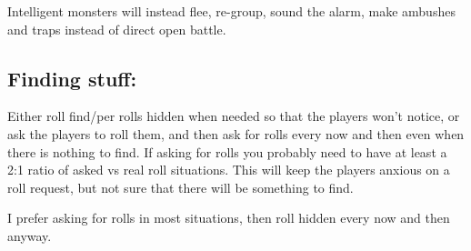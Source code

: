 Intelligent monsters will instead flee, re-group, sound the alarm, make ambushes and traps instead of direct open battle.


\subsection*{Finding stuff:}

Either roll find/per rolls hidden when needed so that the players won't notice, or ask the players to roll them, and then ask for rolls every now and then even when there is nothing to find. If asking for rolls you probably need to have at least a 2:1 ratio of asked vs real roll situations. This will keep the players anxious on a roll request, but not sure that there will be something to find.

I prefer asking for rolls in most situations, then roll hidden every now and then anyway.


